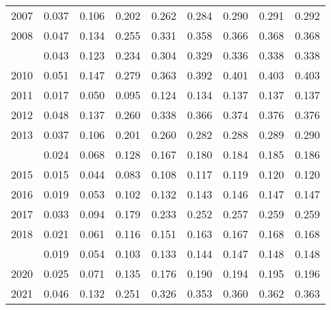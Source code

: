 \documentclass[
]{article}
\begin{document}
\begin{longtable}[t]{lrrrrrrrr}
2007 & 0.037 & 0.106 & 0.202 & 0.262 & 0.284 & 0.290 & 0.291 & 0.292\\
2008 & 0.047 & 0.134 & 0.255 & 0.331 & 0.358 & 0.366 & 0.368 & 0.368\\
\addlinespace
2009 & 0.043 & 0.123 & 0.234 & 0.304 & 0.329 & 0.336 & 0.338 & 0.338\\
2010 & 0.051 & 0.147 & 0.279 & 0.363 & 0.392 & 0.401 & 0.403 & 0.403\\
2011 & 0.017 & 0.050 & 0.095 & 0.124 & 0.134 & 0.137 & 0.137 & 0.137\\
2012 & 0.048 & 0.137 & 0.260 & 0.338 & 0.366 & 0.374 & 0.376 & 0.376\\
2013 & 0.037 & 0.106 & 0.201 & 0.260 & 0.282 & 0.288 & 0.289 & 0.290\\
\addlinespace
2014 & 0.024 & 0.068 & 0.128 & 0.167 & 0.180 & 0.184 & 0.185 & 0.186\\
2015 & 0.015 & 0.044 & 0.083 & 0.108 & 0.117 & 0.119 & 0.120 & 0.120\\
2016 & 0.019 & 0.053 & 0.102 & 0.132 & 0.143 & 0.146 & 0.147 & 0.147\\
2017 & 0.033 & 0.094 & 0.179 & 0.233 & 0.252 & 0.257 & 0.259 & 0.259\\
2018 & 0.021 & 0.061 & 0.116 & 0.151 & 0.163 & 0.167 & 0.168 & 0.168\\
\addlinespace
2019 & 0.019 & 0.054 & 0.103 & 0.133 & 0.144 & 0.147 & 0.148 & 0.148\\
2020 & 0.025 & 0.071 & 0.135 & 0.176 & 0.190 & 0.194 & 0.195 & 0.196\\
2021 & 0.046 & 0.132 & 0.251 & 0.326 & 0.353 & 0.360 & 0.362 & 0.363\\*
\end{longtable}
\end{document}
